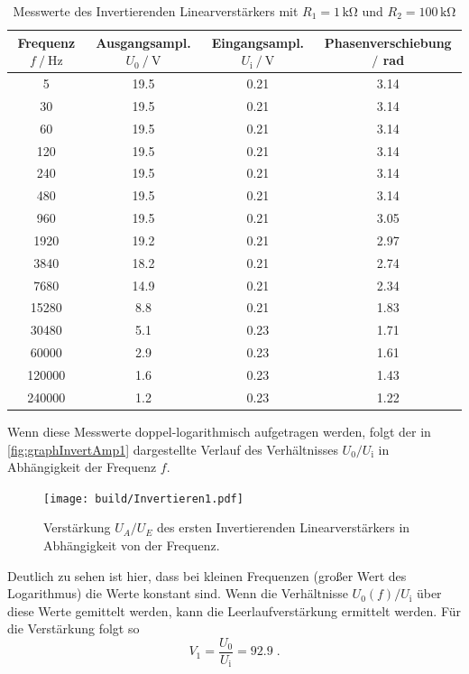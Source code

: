 \begin{table}
    \centering
    \caption{Messwerte des Invertierenden Linearverstärkers mit $R_1=1\,\unit{\kilo\ohm}$ und $R_2=100\,\unit{\kilo\ohm}$}
    \begin{tabular}{c c c c}
        \toprule
        Frequenz $f\mathbin{/}\unit{\hertz}$ & Ausgangsampl. $U_0\mathbin{/}\unit{\volt}$& Eingangsampl. $U_{\text{i}}\mathbin{/}\unit{\volt}$ & Phasenverschiebung $\mathbin{/}$ rad\\
        \midrule
        5	&19.5	&0.21&	3.14\\
        30&	19.5	&0.21&	3.14\\
        60&	19.5	&0.21&	3.14\\
        120&	19.5&	0.21&	3.14\\
        240&	19.5&	0.21&	3.14\\
        480	&19.5	&0.21&	3.14\\
        960	&19.5	&0.21&	3.05\\
        1920&	19.2&	0.21&	2.97\\
        3840&	18.2&	0.21&	2.74\\
        7680&	14.9&	0.21&	2.34\\
        15280&	8.8&	0.21&	1.83\\
        30480&	5.1	&0.23& 1.71\\
        60000&	2.9	&0.23&	1.61\\
        120000&	1.6	&0.23&	1.43\\
        240000&	1.2	&0.23&	1.22\\
        \bottomrule
    \end{tabular}
    \label{tab:InvAmp1}
\end{table}
Wenn diese Messwerte doppel-logarithmisch aufgetragen werden, folgt der in \autoref{fig:graphInvertAmp1} dargestellte Verlauf des Verhältnisses $U_0/U_{\text{i}}$ in Abhängigkeit der Frequenz $f$.

\begin{figure}
    \centering
    \texttt{[image: build/Invertieren1.pdf]}
    \caption{Verstärkung $U_A/U_E$ des ersten Invertierenden Linearverstärkers in Abhängigkeit von der Frequenz.}
    \label{fig:graphInvertAmp1}
\end{figure}
Deutlich zu sehen ist hier, dass bei kleinen Frequenzen (großer Wert des Logarithmus) die Werte konstant sind. Wenn  die Verhältnisse $U_0(f)/U_{\text{i}}$ über diese  Werte gemittelt werden, kann die Leerlaufverstärkung ermittelt werden.
Für die Verstärkung folgt so 
\begin{equation*}
    V_1=\frac{U_0}{U_{\text{i}}}= 92.9  \; .
\end{equation*}

